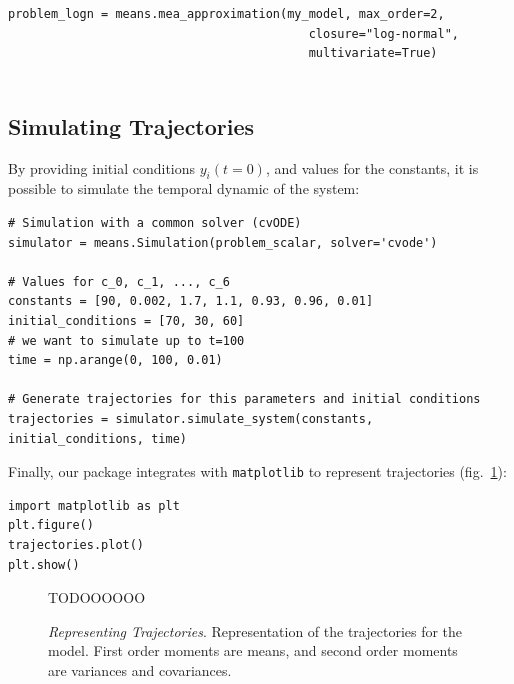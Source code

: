 \begin{framed}
\begin{verbatim}
problem_logn = means.mea_approximation(my_model, max_order=2,
                                          closure="log-normal",
                                          multivariate=True)
                                          
\end{verbatim}
\end{framed}

\subsection{Simulating Trajectories}
By providing initial conditions $y_i(t=0)$, and values for the constants, it is possible to simulate the temporal dynamic of the system:



\begin{framed}
\begin{verbatim}
# Simulation with a common solver (cvODE)
simulator = means.Simulation(problem_scalar, solver='cvode')

# Values for c_0, c_1, ..., c_6
constants = [90, 0.002, 1.7, 1.1, 0.93, 0.96, 0.01]
initial_conditions = [70, 30, 60]
# we want to simulate up to t=100 
time = np.arange(0, 100, 0.01)

# Generate trajectories for this parameters and initial conditions
trajectories = simulator.simulate_system(constants, initial_conditions, time)
\end{verbatim}
\end{framed}

Finally, our package integrates with \texttt{matplotlib} to represent trajectories (fig.~\ref{fig:trajectories_exple}):

\begin{framed}
\begin{verbatim}
import matplotlib as plt
plt.figure()
trajectories.plot()
plt.show()
\end{verbatim}
\end{framed}

\begin{figure}
TODOOOOOO
\caption{\emph{Representing Trajectories}.
Representation of the trajectories for the \pft{} model.
First order moments are means, and second order moments are variances and covariances.
}
\label{fig:trajectories_exple}
\end{figure}



